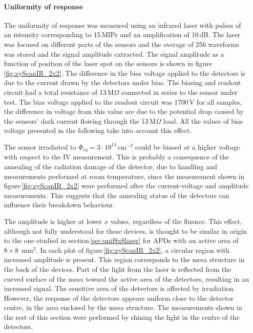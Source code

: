 \documentclass{article}
\begin{document}
\paragraph{Uniformity of response}
The uniformity of response was measured using an infrared laser with pulses of an intensity corresponding to 15\,MIPs and an amplification of 10\,dB.
The laser was focused on different parts of the sensors and the average of 256 waveforms was stored and the signal amplitude extracted.
The signal amplitude as a function of position of the laser spot on the sensors is shown in figure\,\ref{fig:xyScanIR_2x2}.
The difference in the bias voltage applied to the detectors is due to the current drawn by the detectors under bias.
The biasing and readout circuit had a total resistance of 13\,M$\Omega$ connected in series to the sensor under test.
The bias voltage applied to the readout circuit was 1700\,V for all samples, the difference in voltage from this value are due to the potential drop caused by the sensors' dark current flowing through the 13\,M$\Omega$ load.
All the values of bias voltage presented in the following take into account this effect.

The sensor irradiated to $\Phi_{eq} = 3 \cdot 10^{14}$\,cm$^{-2}$ could be biased at a higher voltage with respect to the IV measurement.
This is probably a consequence of the annealing of the radiation damage of the detector, due to handling and measurements performed at room temperature, since the measurement shown in figure\,\ref{fig:xyScanIR_2x2} were performed after the current-voltage and amplitude measurements.
This suggests that the annealing status of the detectors can influence their breakdown behaviour.

The amplitude is higher at lower $x$ values, regardless of the fluence.
This effect, although not fully understood for these devices, is thought to be similar in origin to the one studied in section\,\ref{sec:unif8x8laser} for APDs with an active area of $8 \times 8$~mm$^2$.
In each plot of figure\,\ref{fig:xyScanIR_2x2}, a circular region with increased amplitude is present.
This region corresponds to the mesa structure in the back of the devices.
Part of the light from the laser is reflected from the curved surface of the mesa toward the active area of the detectors, resulting in an increased signal.
The sensitive area of the detectors is affected by irradiation.
However, the response of the detectors appears uniform close to the detector centre, in the area enclosed by the mesa structure.
The measurements shown in the rest of this section were performed by shining the light in the centre of the detectors.
\end{document}

